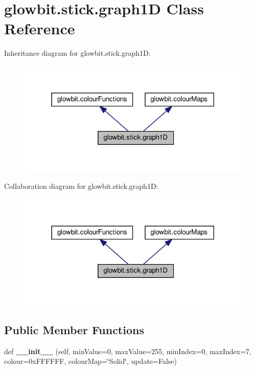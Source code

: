 \hypertarget{classglowbit_1_1stick_1_1graph1D}{}\section{glowbit.\+stick.\+graph1D Class Reference}
\label{classglowbit_1_1stick_1_1graph1D}


Inheritance diagram for glowbit.\+stick.\+graph1D\+:\nopagebreak
\begin{figure}[H]
\begin{center}
\leavevmode
\includegraphics[width=318pt]{classglowbit_1_1stick_1_1graph1D__inherit__graph}
\end{center}
\end{figure}


Collaboration diagram for glowbit.\+stick.\+graph1D\+:\nopagebreak
\begin{figure}[H]
\begin{center}
\leavevmode
\includegraphics[width=318pt]{classglowbit_1_1stick_1_1graph1D__coll__graph}
\end{center}
\end{figure}
\subsection*{Public Member Functions}
\begin{DoxyCompactItemize}
\item 
\mbox{\label{classglowbit_1_1stick_1_1graph1D_a46a0e6a76c186a975f7cc335faa9480f}} 
def {\bfseries \+\_\+\+\_\+init\+\_\+\+\_\+} (self, min\+Value=0, max\+Value=255, min\+Index=0, max\+Index=7, colour=0x\+F\+F\+F\+F\+F\+F, colour\+Map=\char`\"{}\+Solid\char`\"{}, update=\+False)
\end{DoxyCompactItemize}
